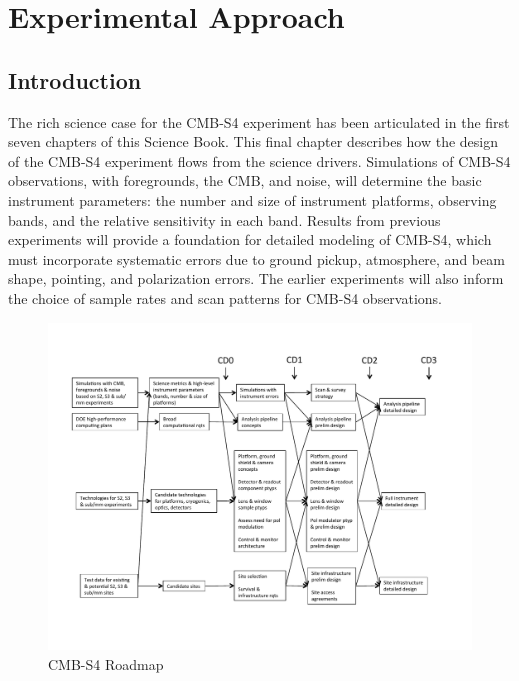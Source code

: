  
\chapter{Experimental Approach}

\def\nnu{N_{\mathrm eff}}
\def\gtrsim{\raise-.75ex\hbox{$\buildrel>\over\sim$}}

\section{Introduction}


The rich science case for the CMB-S4 experiment has been articulated in the first seven chapters of this Science Book.  This final chapter describes how the design of the CMB-S4 experiment flows from the science drivers.   Simulations of CMB-S4 observations, with foregrounds, the CMB, and noise, will determine the basic instrument parameters: the number and size of instrument platforms, observing bands, and the relative sensitivity in each band. Results from previous experiments will provide a foundation for detailed modeling of CMB-S4, which must incorporate systematic errors due to ground pickup, atmosphere, and beam shape, pointing, and polarization errors. The earlier experiments will also inform the choice of sample rates and scan patterns for CMB-S4 observations.

\begin{figure}[h!]
\centering
\includegraphics[trim = 0.4in 0.7in 0.8in 0.7in, clip, width=1.0\textwidth]{Instrumentation/S4TechnicalDecisionsPlan.pdf}
\caption{CMB-S4 Roadmap}
\label{fig:roadmap}
\end{figure}



